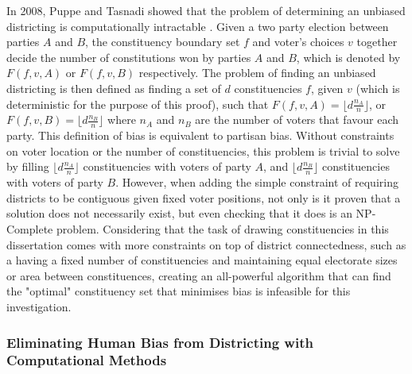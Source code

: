 \documentclass{article}
\begin{document}
In 2008, Puppe and Tasnadi showed that the problem of determining an unbiased districting is computationally intractable \cite{unbiaseddistricts}. Given a two party election between parties
$A$ and $B$, the constituency boundary set $f$ and voter's choices $v$ together decide the number of constitutions won by parties $A$ and $B$, which is denoted by \(F(f, v, A)\) or 
\(F(f, v, B)\) respectively. The problem of finding an unbiased districting is then defined as finding a set of $d$ constituencies $f$, given $v$ (which is deterministic for the purpose of this proof), such that 
\(F(f, v, A) = \lfloor d\frac{n_A}{n} \rfloor\), or \(F(f, v, B) = \lfloor d\frac{n_B}{n} \rfloor\) where \(n_A\) and \(n_B\) are the number of voters that favour each party. This definition of bias is equivalent to partisan bias. Without constraints on voter location or the number of constituencies, this problem 
is trivial to solve by filling \(\lfloor d\frac{n_A}{n} \rfloor\) constituencies with voters of party $A$, and \(\lfloor d\frac{n_B}{n} \rfloor\) constituencies with voters of party $B$. However, when adding the simple constraint of requiring districts to be contiguous given fixed voter positions, not only is it proven that a solution does not necessarily exist, 
but even checking that it does is an NP-Complete problem. Considering that the task of drawing constituencies in this dissertation comes with more constraints on top of district connectedness, such as a having a fixed number of constituencies and
maintaining equal electorate sizes or area between constituences, creating an all-powerful algorithm that can find the "optimal" constituency set that minimises bias is infeasible for this investigation.

\subsubsection{Eliminating Human Bias from Districting with Computational Methods}
\end{document}
